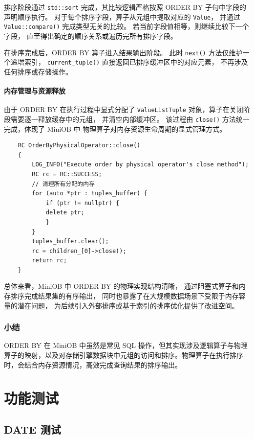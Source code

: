 \documentclass[a4paper, 12pt]{article}
\begin{document}
排序阶段通过 \texttt{std::sort} 完成，其比较逻辑严格按照
ORDER BY 子句中字段的声明顺序执行。
对于每个排序字段，算子从元组中提取对应的 \texttt{Value}，
并通过 \texttt{Value::compare()} 完成类型无关的比较。
若当前字段值相等，则继续比较下一个字段，
直至得出确定的顺序关系或遍历完所有排序字段。

在排序完成后，ORDER BY 算子进入结果输出阶段。
此时 \texttt{next()} 方法仅维护一个递增索引，
\texttt{current\_tuple()} 直接返回已排序缓冲区中的对应元素，
不再涉及任何排序或存储操作。

\paragraph{\heiti 内存管理与资源释放}

由于 ORDER BY 在执行过程中显式分配了
\texttt{ValueListTuple} 对象，算子在关闭阶段需要逐一释放缓存中的元组，
并清空内部缓冲区。
该过程由 \texttt{close()} 方法统一完成，体现了 MiniOB 中
物理算子对内存资源生命周期的显式管理方式。

\begin{verbatim}
    RC OrderByPhysicalOperator::close()
    {
        LOG_INFO("Execute order by physical operator's close method");
        RC rc = RC::SUCCESS;
        // 清理所有分配的内存
        for (auto *ptr : tuples_buffer) {
            if (ptr != nullptr) {
            delete ptr;
            }
        }
        tuples_buffer.clear();
        rc = children_[0]->close();
        return rc;
    }
\end{verbatim}

总体来看，MiniOB 中 ORDER BY 的物理实现结构清晰，
通过阻塞式算子和内存排序完成结果集的有序输出，
同时也暴露了在大规模数据场景下受限于内存容量的潜在问题，
为后续引入外部排序或基于索引的排序优化提供了改进空间。

\subsubsection{小结}
ORDER BY 在 MiniOB 中虽然是常见 SQL 操作，但其实现涉及逻辑算子与物理算子的映射，以及对存储引擎数据块中元组的访问和排序。物理算子在执行排序时，会结合内存资源情况，高效完成查询结果的排序输出。

\section{功能测试}

\subsection{\heiti DATE 测试}
\end{document}
